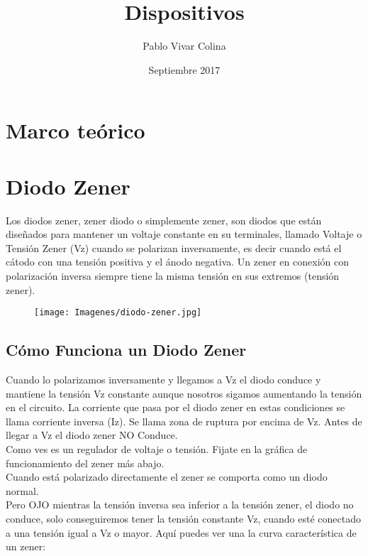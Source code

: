 \documentclass{article}
\title{Dispositivos}
\author{Pablo Vivar Colina}
\date{Septiembre 2017}
\begin{document}



\section{Marco teórico}

\section{Diodo Zener}

 Los diodos zener, zener diodo o simplemente zener, son diodos que están diseñados para mantener un voltaje constante en su terminales, llamado Voltaje o Tensión Zener (Vz) cuando se polarizan inversamente, es decir cuando está el cátodo con una tensión positiva y el ánodo negativa. Un zener en conexión con polarización inversa siempre tiene la misma tensión en sus extremos (tensión zener).\citep{dZener}\\

\begin{figure}[ht!]
   \centering
\texttt{[image: Imagenes/diodo-zener.jpg]}
\caption{}
     \label{fig:zener}
 \end{figure}
 
 \subsection{Cómo Funciona un Diodo Zener}

 Cuando lo polarizamos inversamente y llegamos a Vz el diodo conduce y mantiene la tensión Vz constante aunque nosotros sigamos aumentando la tensión en el circuito. La corriente que pasa por el diodo zener en estas condiciones se llama corriente inversa (Iz).
 Se llama zona de ruptura por encima de Vz. Antes de llegar a Vz el diodo zener NO Conduce.\citep{dZener}\\

 Como ves es un regulador de voltaje o tensión. Fijate en la gráfica de funcionamiento del zener más abajo.\citep{dZener}\\

 Cuando está polarizado directamente el zener se comporta como un diodo normal.\citep{dZener}\\

 Pero OJO mientras la tensión inversa sea inferior a la tensión zener, el diodo no conduce, solo conseguiremos tener la tensión constante Vz, cuando esté conectado a una tensión igual a Vz o mayor. Aquí puedes ver una la curva característica de un zener:\citep{dZener}\\
 
\end{document}
